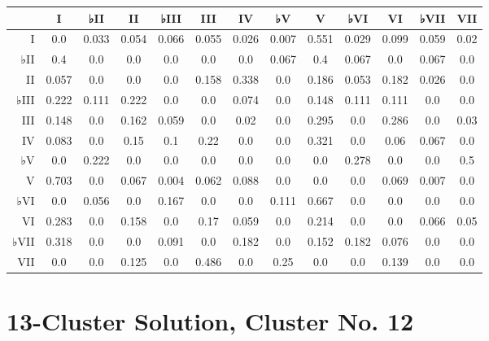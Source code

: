 \begin{table}[htbp]
\begin{minipage}{\linewidth}
\setlength{\tymax}{0.5\linewidth}
\centering
\small
\begin{tabulary}{\textwidth}{@{}RCCCCCCCCCCCC@{}} \toprule
&I&♭II&II&♭III&III&IV&♭V&V&♭VI&VI&♭VII&VII\\
\midrule
I&0.0&0.033&0.054&0.066&0.055&0.026&0.007&0.551&0.029&0.099&0.059&0.02\\
♭II&0.4&0.0&0.0&0.0&0.0&0.0&0.067&0.4&0.067&0.0&0.067&0.0\\
II&0.057&0.0&0.0&0.0&0.158&0.338&0.0&0.186&0.053&0.182&0.026&0.0\\
♭III&0.222&0.111&0.222&0.0&0.0&0.074&0.0&0.148&0.111&0.111&0.0&0.0\\
III&0.148&0.0&0.162&0.059&0.0&0.02&0.0&0.295&0.0&0.286&0.0&0.03\\
IV&0.083&0.0&0.15&0.1&0.22&0.0&0.0&0.321&0.0&0.06&0.067&0.0\\
♭V&0.0&0.222&0.0&0.0&0.0&0.0&0.0&0.0&0.278&0.0&0.0&0.5\\
V&0.703&0.0&0.067&0.004&0.062&0.088&0.0&0.0&0.0&0.069&0.007&0.0\\
♭VI&0.0&0.056&0.0&0.167&0.0&0.0&0.111&0.667&0.0&0.0&0.0&0.0\\
VI&0.283&0.0&0.158&0.0&0.17&0.059&0.0&0.214&0.0&0.0&0.066&0.05\\
♭VII&0.318&0.0&0.0&0.091&0.0&0.182&0.0&0.152&0.182&0.076&0.0&0.0\\
VII&0.0&0.0&0.125&0.0&0.486&0.0&0.25&0.0&0.0&0.139&0.0&0.0\\

\bottomrule

\end{tabulary}
\end{minipage}
\end{table}

\section{13-Cluster Solution, Cluster No. 12}
\label{13-clustersolutionclusterno.12}


